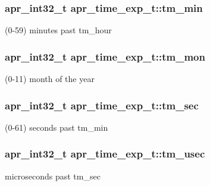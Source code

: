 \subsubsection[{\texorpdfstring{tm\+\_\+min}{tm_min}}]{\setlength{\rightskip}{0pt plus 5cm}apr\+\_\+int32\+\_\+t apr\+\_\+time\+\_\+exp\+\_\+t\+::tm\+\_\+min}\hypertarget{structapr__time__exp__t_a56a380db482ba5b2bef43351faad27fb}{}\label{structapr__time__exp__t_a56a380db482ba5b2bef43351faad27fb}
(0-\/59) minutes past tm\+\_\+hour 
\subsubsection[{\texorpdfstring{tm\+\_\+mon}{tm_mon}}]{\setlength{\rightskip}{0pt plus 5cm}apr\+\_\+int32\+\_\+t apr\+\_\+time\+\_\+exp\+\_\+t\+::tm\+\_\+mon}\hypertarget{structapr__time__exp__t_a746f38956dfeb6be3bd17282791e3577}{}\label{structapr__time__exp__t_a746f38956dfeb6be3bd17282791e3577}
(0-\/11) month of the year 
\subsubsection[{\texorpdfstring{tm\+\_\+sec}{tm_sec}}]{\setlength{\rightskip}{0pt plus 5cm}apr\+\_\+int32\+\_\+t apr\+\_\+time\+\_\+exp\+\_\+t\+::tm\+\_\+sec}\hypertarget{structapr__time__exp__t_a2c29c99a75b55237917cb05ebae6706c}{}\label{structapr__time__exp__t_a2c29c99a75b55237917cb05ebae6706c}
(0-\/61) seconds past tm\+\_\+min 
\subsubsection[{\texorpdfstring{tm\+\_\+usec}{tm_usec}}]{\setlength{\rightskip}{0pt plus 5cm}apr\+\_\+int32\+\_\+t apr\+\_\+time\+\_\+exp\+\_\+t\+::tm\+\_\+usec}\hypertarget{structapr__time__exp__t_ac5f11e3c1f5a30d357df2108296a8d30}{}\label{structapr__time__exp__t_ac5f11e3c1f5a30d357df2108296a8d30}
microseconds past tm\+\_\+sec 
